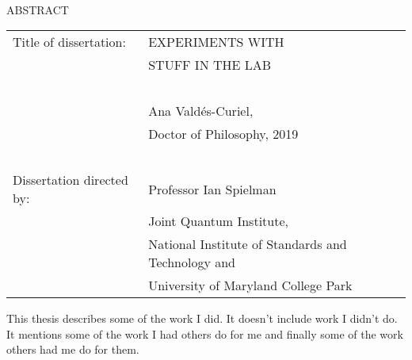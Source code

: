 
\hbox{\ }

\renewcommand{\baselinestretch}{1}
\small \normalsize

\begin{center}
\large{{ABSTRACT}} 

\vspace{3em} 

\end{center}
\hspace{-.15in}
\begin{tabular}{ll}
Title of dissertation:   
&				      {\large  EXPERIMENTS WITH} \\
&				      {\large  STUFF IN THE LAB} \\
\ \\
&                     {\large  Ana Valdés-Curiel,} \\
&					  {\large  Doctor of Philosophy, 2019} \\
\ \\
Dissertation directed by: & {\large  Professor Ian Spielman} \\
&  							{\small	 Joint Quantum Institute,} \\
&  							{\small	 National Institute of Standards and Technology and} \\
&  							{\small	 University of Maryland College Park} \\
\end{tabular}

\vspace{3em}

\renewcommand{\baselinestretch}{2}
\large \normalsize

This thesis describes some of the work I did. It doesn't include work I didn't do. It mentions some of the work I had others do for me and finally some of the work others had me do for them.


